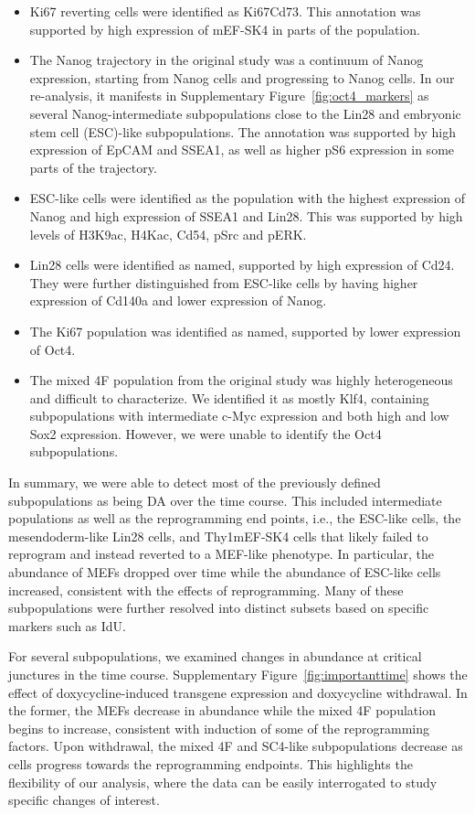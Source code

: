 \documentclass{article}
\begin{document}
\begin{itemize}
    \item Ki67\lo{} reverting cells were identified as Ki67\lo{}Cd73\hi{}.
        This annotation was supported by high expression of mEF-SK4 in parts of the population.
    \item The Nanog\hi{} trajectory in the original study was a continuum of Nanog expression, starting from Nanog\lo{} cells and progressing to Nanog\hi{} cells.
        In our re-analysis, it manifests in Supplementary Figure~\ref{fig:oct4_markers} as several Nanog-intermediate subpopulations close to the Lin28\hi{} and embryonic stem cell (ESC)-like subpopulations.
        The annotation was supported by high expression of EpCAM and SSEA1, as well as higher pS6 expression in some parts of the trajectory.
    \item ESC-like cells were identified as the population with the highest expression of Nanog and high expression of SSEA1 and Lin28.
        This was supported by high levels of H3K9ac, H4Kac, Cd54, pSrc and pERK.
    \item Lin28\hi{} cells were identified as named, supported by high expression of Cd24.
They were further distinguished from ESC-like cells by having higher expression of Cd140a and lower expression of Nanog.
    \item The Ki67\hi{} population was identified as named, supported by lower expression of Oct4.
    \item The mixed 4F population from the original study was highly heterogeneous and difficult to characterize.
We identified it as mostly Klf4\lo{}, containing subpopulations with intermediate c-Myc expression and both high and low Sox2 expression.
However, we were unable to identify the Oct4\lo{} subpopulations.
\end{itemize}
In summary, we were able to detect most of the previously defined subpopulations as being DA over the time course.
This included intermediate populations as well as the reprogramming end points, i.e., the ESC-like cells, the mesendoderm-like Lin28\hi{} cells, and Thy1\hi{}mEF-SK4\hi{} cells that likely failed to reprogram and instead reverted to a MEF-like phenotype.
In particular, the abundance of MEFs dropped over time while the abundance of ESC-like cells increased, consistent with the effects of reprogramming.
Many of these subpopulations were further resolved into distinct subsets based on specific markers such as IdU.

For several subpopulations, we examined changes in abundance at critical junctures in the time course.
Supplementary Figure~\ref{fig:importanttime} shows the effect of doxycycline-induced transgene expression and doxycycline withdrawal.
In the former, the MEFs decrease in abundance while the mixed 4F population begins to increase, consistent with induction of some of the reprogramming factors.
Upon withdrawal, the mixed 4F and SC4-like subpopulations decrease as cells progress towards the reprogramming endpoints.
This highlights the flexibility of our analysis, where the data can be easily interrogated to study specific changes of interest.
\end{document}
